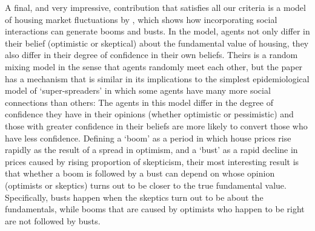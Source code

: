 A final, and very impressive, contribution that satisfies all our criteria is a model of housing market fluctuations by \href{https://www.journals.uchicago.edu/doi/abs/10.1086/686732}{\cite{burnside_understanding_2016}}, which shows how incorporating social interactions can generate booms and busts. In the model, agents not only differ in their belief (optimistic or skeptical) about the fundamental value of housing, they also differ in their degree of confidence in their own beliefs.  Theirs is a random mixing model in the sense that agents randomly meet each other, but the paper has a mechanism that is similar in its implications to the simplest epidemiological model of `super-spreaders' in which some agents have many more social connections than others:  The agents in this model differ in the degree of confidence they have in their opinions (whether optimistic or pessimistic) and those with greater confidence in their beliefs are more likely to convert those who have less confidence.  Defining a `boom' as a period in which house prices rise rapidly as the result of a spread in optimism, and a `bust' as a rapid decline in prices caused by rising proportion of skepticism, their most interesting result is that whether a boom is followed by a bust can depend on whose opinion (optimists or skeptics) turns out to be closer to the true fundamental value.  Specifically, busts happen when the skeptics turn out to be about the fundamentals, while booms that are caused by optimists who happen to be right are not followed by busts.

